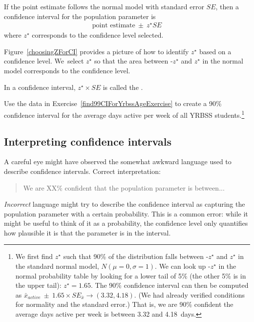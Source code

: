 \begin{termBox}{
If the point estimate follows the normal model with standard error $SE$, then a confidence interval for the population parameter is
\begin{eqnarray*}
\text{point estimate}\ \pm\ z^{\star} SE
\end{eqnarray*}
where $z^{\star}$ corresponds to the confidence level selected.}
\end{termBox}

Figure~\ref{choosingZForCI} provides a picture of how to identify $z^{\star}$ based on a confidence level. We~select $z^{\star}$ so that the area between -$z^{\star}$ and $z^{\star}$ in the normal model corresponds to the confidence level. 

\begin{termBox}{
\label{marginOfErrorTermBox}In a confidence interval, $z^{\star}\times SE$ is called the .}
\end{termBox}

\begin{exercise} \label{find90CIForYrbssAgeExercise}
Use the data in Exercise~\ref{find99CIForYrbssAgeExercise} to create a 90\% confidence interval for the average days active per week of all YRBSS students.\footnote{We first find $z^{\star}$ such that 90\% of the distribution falls between -$z^{\star}$ and $z^{\star}$ in the standard normal model, $N(\mu=0, \sigma=1)$. We can look up -$z^{\star}$ in the normal probability table by looking for a lower tail of 5\% (the other 5\% is in the upper tail): $z^{\star}=1.65$. The 90\% confidence interval can then be computed as $\bar{x}_{active}\ \pm\ 1.65\times SE_{\bar{x}} \to (3.32, 4.18)$. (We had already verified conditions for normality and the standard error.) That is, we are 90\% confident the average days active per week is between 3.32 and 4.18~days.}
\end{exercise}

\subsection{Interpreting confidence intervals}
\label{interpretingCIs}


A careful eye might have observed the somewhat awkward language used to describe confidence intervals. Correct interpretation:
\begin{quote}
We are XX\% confident that the population parameter is between...
\end{quote}
\emph{Incorrect} language might try to describe the confidence interval as capturing the population parameter with a certain probability. This is a common error: while it might be useful to think of it as a probability, the confidence level only quantifies how plausible it is that the parameter is in the interval.

